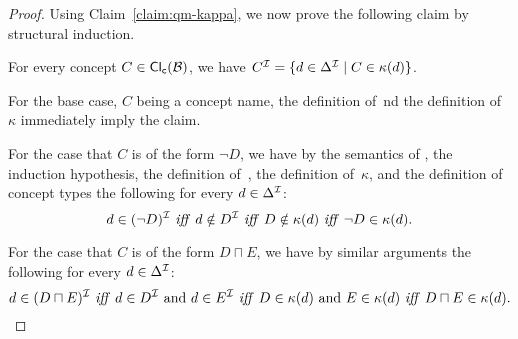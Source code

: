 \begin{proof}
    Using Claim~\ref{claim:qm-kappa}, we now prove the following claim by
    structural induction.
    \begin{claim}\label{claim:qm-concepts}
        For every concept $C\in\operatorname{\mathsf{Cl_c}}(\mathcal{B})$, we have
        $C^\mathcal{I}=\{d\in\Delta^\mathcal{I}\mid C\in\kappa(d)\}$.
    \end{claim}

    \noindent
    For the base case, $C$ being a concept name, the definition of~\Imc nd the
    definition of~$\kappa$ immediately imply the claim.

    For the case that $C$ is of the form $\lnot D$, we have by the semantics of
    \SHOQcap, the induction hypothesis, the definition of~\Imc, the definition
    of~$\kappa$, and the definition of concept types the following for every
    $d\in\Delta^\mathcal{I}$:
    \[d\in(\lnot D)^\mathcal{I}\text{ \emph{iff} } d\notin D^\mathcal{I}\text{ \emph{iff} }
        D\notin\kappa(d)\text{ \emph{iff} }\lnot D\in\kappa(d).\]

    \noindent
    For the case that $C$ is of the form $D\sqcap E$, we have by similar
    arguments the following for every $d\in\Delta^\mathcal{I}$:
    \[d\in(D\sqcap E)^\mathcal{I}\text{ \emph{iff} }d\in D^\mathcal{I}\text{ and }d\in E^\mathcal{I}
        \text{ \emph{iff} }D\in\kappa(d)\text{ and }E\in\kappa(d)\text{ \emph{iff} }
        D\sqcap E\in\kappa(d).\]


\end{proof}
